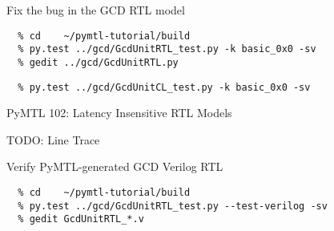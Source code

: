 \begin{task}\begin{frame}[fragile]{Fix the bug in the GCD RTL model}
\vspace{-0.25in}
\begin{verbatim}
  % cd    ~/pymtl-tutorial/build
  % py.test ../gcd/GcdUnitRTL_test.py -k basic_0x0 -sv
  % gedit ../gcd/GcdUnitRTL.py
\end{verbatim}


\vspace{-0.3in}
\begin{verbatim}
  % py.test ../gcd/GcdUnitCL_test.py -k basic_0x0 -sv
\end{verbatim}
\end{frame}
\end{task}

\begin{frame}{PyMTL 102: Latency Insensitive RTL Models}

TODO: Line Trace

\end{frame}

\begin{task}\begin{frame}[fragile]{Verify PyMTL-generated GCD Verilog RTL}
\vspace{-0.25in}
\begin{verbatim}
  % cd    ~/pymtl-tutorial/build
  % py.test ../gcd/GcdUnitRTL_test.py --test-verilog -sv
  % gedit GcdUnitRTL_*.v
\end{verbatim}
\end{frame}
\end{task}

